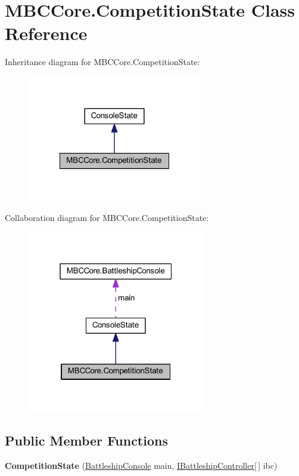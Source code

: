 \hypertarget{class_m_b_c_core_1_1_competition_state}{\section{M\-B\-C\-Core.\-Competition\-State Class Reference}
\label{class_m_b_c_core_1_1_competition_state}
}


Inheritance diagram for M\-B\-C\-Core.\-Competition\-State\-:\nopagebreak
\begin{figure}[H]
\begin{center}
\leavevmode
\includegraphics[width=216pt]{class_m_b_c_core_1_1_competition_state__inherit__graph}
\end{center}
\end{figure}


Collaboration diagram for M\-B\-C\-Core.\-Competition\-State\-:\nopagebreak
\begin{figure}[H]
\begin{center}
\leavevmode
\includegraphics[width=220pt]{class_m_b_c_core_1_1_competition_state__coll__graph}
\end{center}
\end{figure}
\subsection*{Public Member Functions}
\begin{DoxyCompactItemize}
\item 
\hypertarget{class_m_b_c_core_1_1_competition_state_a7b7cc08b95581d0e8fab5c7cd77a15e8}{{\bfseries Competition\-State} (\hyperlink{class_m_b_c_core_1_1_battleship_console}{Battleship\-Console} main, \hyperlink{interface_m_b_c_core_1_1_i_battleship_controller}{I\-Battleship\-Controller}\mbox{[}$\,$\mbox{]} ibc)}\label{class_m_b_c_core_1_1_competition_state_a7b7cc08b95581d0e8fab5c7cd77a15e8}

\end{DoxyCompactItemize}
